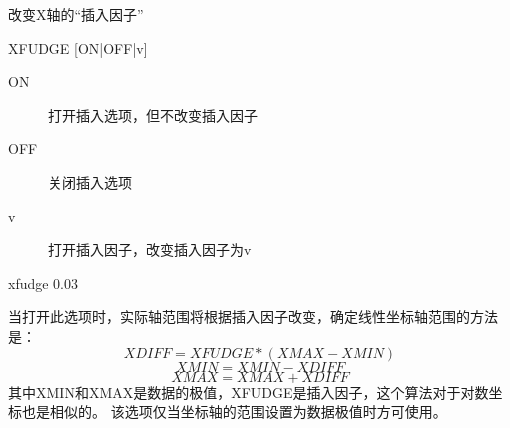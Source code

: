 \label{cmd:xfudge}

改变X轴的``插入因子''

\begin{SACSTX}
XFUDGE [ON|OFF|v]
\end{SACSTX}

\begin{description}
\item [ON] 打开插入选项，但不改变插入因子 
\item [OFF] 关闭插入选项 
\item [v] 打开插入因子，改变插入因子为v 
\end{description}

\begin{SACDFT}
xfudge 0.03
\end{SACDFT}

当打开此选项时，实际轴范围将根据插入因子改变，确定线性坐标轴范围的方法是：
\[ XDIFF=XFUDGE*(XMAX-XMIN) \]
\[ XMIN=XMIN-XDIFF \]
\[ XMAX=XMAX+XDIFF \]
其中XMIN和XMAX是数据的极值，XFUDGE是插入因子，这个算法对于对数坐标也是相似的。
该选项仅当坐标轴的范围设置为数据极值时方可使用。

